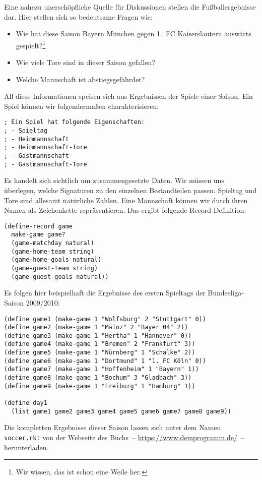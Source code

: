Eine nahezu unerschöpfliche Quelle für Diskussionen stellen die
Fußballergebnisse dar.  Hier stellen sich so bedeutsame Fragen wie:
\begin{itemize}
\item Wie hat diese Saison Bayern München gegen 1.~FC Kaiserslautern
  auswärts gespielt?\footnote{Wir wissen, das ist schon eine Weile her.}
\item Wie viele Tore sind in dieser Saison gefallen?
\item Welche Mannschaft ist abstiegsgefährdet?
\end{itemize}
%
All diese Informationen speisen sich aus Ergebnissen der Spiele einer
Saison.  Ein Spiel können wir folgendermaßen charakterisieren:
%
\begin{lstlisting}
; Ein Spiel hat folgende Eigenschaften:
; - Spieltag
; - Heimmannschaft
; - Heimmannschaft-Tore
; - Gastmannschaft
; - Gastmannschaft-Tore
\end{lstlisting}
%
Es handelt sich sichtlich um zusammengesetzte Daten.  Wir müssen uns
überlegen, welche Signaturen zu den einzelnen Bestandteilen passen.
Spieltag und Tore sind allesamt natürliche Zahlen.  Eine Mannschaft können
wir durch ihren Namen als Zeichenkette repräsentieren.   Das ergibt
folgende Record-Definition:
\begin{lstlisting}
(define-record game
  make-game game?
  (game-matchday natural)
  (game-home-team string)
  (game-home-goals natural)
  (game-guest-team string)
  (game-guest-goals natural))
\end{lstlisting}
%
Es folgen hier beispielhaft die Ergebnisse des ersten Spieltags der Bundesliga-Saison
2009/2010:
\begin{lstlisting}
(define game1 (make-game 1 "Wolfsburg" 2 "Stuttgart" 0))
(define game2 (make-game 1 "Mainz" 2 "Bayer 04" 2))
(define game3 (make-game 1 "Hertha" 1 "Hannover" 0))
(define game4 (make-game 1 "Bremen" 2 "Frankfurt" 3))
(define game5 (make-game 1 "Nürnberg" 1 "Schalke" 2))
(define game6 (make-game 1 "Dortmund" 1 "1. FC Köln" 0))
(define game7 (make-game 1 "Hoffenheim" 1 "Bayern" 1))
(define game8 (make-game 1 "Bochum" 3 "Gladbach" 3))
(define game9 (make-game 1 "Freiburg" 1 "Hamburg" 1))

(define day1
  (list game1 game2 game3 game4 game5 game6 game7 game8 game9))
\end{lstlisting}
%
Die kompletten Ergebnisse dieser Saison lassen sich unter dem Namen
\texttt{soccer.rkt} von der Webseite des Buchs~--
\url{https://www.deinprogramm.de/}~-- herunterladen.

